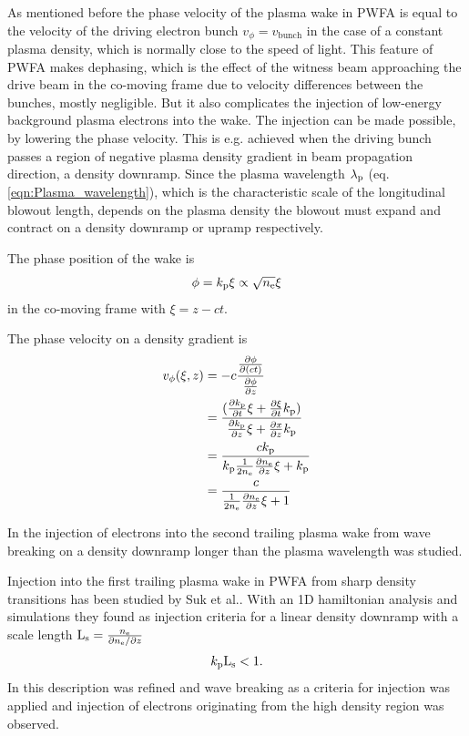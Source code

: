 As mentioned before the phase velocity of the plasma wake in PWFA is equal to the velocity of the driving electron bunch $v_\phi=v_\mathrm{bunch}$ in the case of a constant plasma density, which is normally close to the speed of light. This feature of PWFA makes dephasing, which is the effect of the witness beam approaching the drive beam in the co-moving frame due to velocity differences between the bunches, mostly negligible. But it also complicates the injection of low-energy background plasma electrons into the wake. 
The injection can be made possible, by lowering the phase velocity. This is e.g. achieved when the driving bunch passes a region of negative plasma density gradient in beam propagation direction, a density downramp. 
Since the plasma wavelength $\lambda_\mathrm{p}$ (eq. \ref{eqn:Plasma_wavelength}), which is the characteristic scale of the longitudinal blowout length, depends on the plasma density the blowout must expand and contract on a density downramp or upramp respectively.

The phase position of the wake is
\begin{equation}
\phi=k_\mathrm{p}\xi \propto \sqrt{n_\mathrm{e}}\xi
\end{equation}
in the co-moving frame with $\xi=z-ct$.

The phase velocity on a density gradient is 
\begin{align}
v_\phi(\xi,z)&=-c\frac{\frac{\partial \phi}{\partial (ct)}}{\frac{\partial \phi}{\partial z}}\\
&=\frac{(\frac{\partial k_\mathrm{p}}{\partial t}\xi+\frac{\partial \xi}{\partial t} k_\mathrm{p})}{\frac{\partial k_\mathrm{p}}{\partial z}\xi + \frac{\partial x}{\partial z}k_\mathrm{p}}\\
&=\frac{ck_\mathrm{p}}{k_\mathrm{p}\frac{1}{2n_\mathrm{e}}\frac{ \partial n_\mathrm{e}}{\partial z}\xi+k_\mathrm{p} }\\
&=\frac{c}{\frac{1}{2n_\mathrm{e}}\frac{ \partial n_\mathrm{e}}{\partial z}\xi+1 }
\end{align}



In \cite{BulanovPRE98WaveBreak} the injection of electrons into the second trailing plasma wake from wave breaking on a density downramp longer than the plasma wavelength was studied.

Injection into the first trailing plasma wake in PWFA from sharp density transitions has been studied by Suk et al.\cite{suk2001_PRL_DensityTransition}. With an 1D hamiltonian analysis and simulations they found as injection criteria for a linear density downramp with a scale length $\mathrm{L}_\mathrm{s} = \frac{n_\mathrm{e}}{\partial n_\mathrm{e} / \partial z}$
\begin{equation}
k_\mathrm{p} \mathrm{L}_\mathrm{s}<1.
\label{eqn:kpLs}
\end{equation}
In \cite{england2002PREDensityTransition} this description was refined and wave breaking as a criteria for injection was applied and injection of electrons originating from the high density region was observed.

